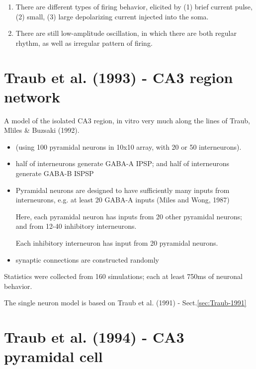 \begin{enumerate}
\item There are different types of firing behavior, elicited by (1)
  brief current pulse, (2) small, (3) large depolarizing current
  injected into the soma.
\item There are still low-amplitude oscillation, in which there are
  both regular rhythm, as well as irregular pattern of firing. 

\end{enumerate}

\section{Traub et al. (1993) - CA3 region network}


A model of the isolated CA3 region, in vitro very much along the lines of Traub,
Mliles \& Buzsaki (1992).
\begin{itemize}

  \item   (using 100 pyramidal neurons in 10x10 array, with 20 or 50
  interneurons).
  
  \item half of interneurons generate GABA-A IPSP; and half of interneurons
  generate GABA-B ISPSP

  \item Pyramidal neurons are designed to have sufficiently many inputs from
  interneurons, e.g. at least 20 GABA-A inputs (Miles and Wong, 1987)
  
  Here, each pyramidal neuron has inputs from 20 other pyramidal neurons; and
  from 12-40 inhibitory interneurons.
  
  Each inhibitory interneuron has input from 20 pyramidal neurons.
  
  \item synaptic connections are constructed randomly 
\end{itemize}
Statistics were collected from 160 simulations; each at least 750ms of neuronal
behavior.

The single neuron model is based on Traub et al. (1991) - Sect.\ref{sec:Traub-1991}



\section{Traub et al. (1994) - CA3 pyramidal cell}
\label{sec:Traub-1994-pyramidal}

